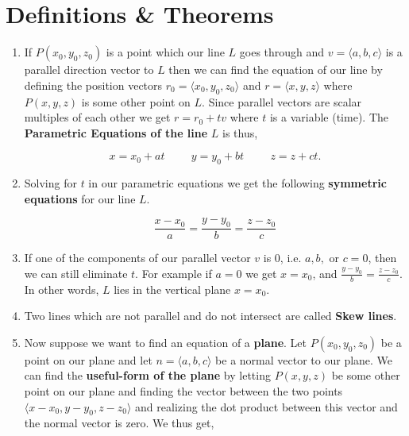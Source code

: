 \documentclass[11pt]{article}
\begin{document}
\section{Definitions \& Theorems}
\begin{enumerate}
    \item If $P(x_0,y_0,z_0)$ is a point which our line $L$ goes through and $v=\langle a,b,c \rangle$ is a parallel direction vector to $L$ then we can find the equation of our line by defining the position vectors $r_0 = \langle x_0,y_0,z_0 \rangle$ and $r = \langle x,y,z \rangle$ where $P(x,y,z)$ is some other point on $L$. Since parallel vectors are scalar multiples of each other we get $r=r_0+tv$ where $t$ is a variable (time). The \textbf{Parametric Equations of the line} $L$ is thus,

    \begin{equation*}
        x=x_0+at \hspace{1cm} y=y_0+bt \hspace{1cm} z = z+ct.
    \end{equation*}


\item  Solving for $t$ in our parametric equations we get the following \textbf{symmetric equations} for our line $L$.

\begin{equation*}
    \frac{x-x_0}{a} = \frac{y-y_0}{b} = \frac{z-z_0}{c}
\end{equation*}

\item  If one of the components of our parallel vector $v$ is 0, i.e. $a,b, \text{ or } c = 0$, then we can still eliminate $t$. For example if $a=0$ we get $x=x_0$, and $\frac{y-y_0}{b}=\frac{z-z_0}{c}$. In other words, $L$ lies in the vertical plane $x=x_0$.

\item Two lines which are not parallel and do not intersect are called \textbf{Skew lines}.

\item Now suppose we want to find an equation of a \textbf{plane}. Let $P(x_0,y_0,z_0)$ be a point on our plane and let $n = \langle a,b,c \rangle$ be a normal vector to our plane. We can find the \textbf{useful-form of the plane} by letting $P(x,y,z)$ be some other point on our plane and finding the vector between the two points $\langle x-x_0,y-y_0,z-z_0 \rangle$ and realizing the dot product between this vector and the normal vector is zero. We thus get,


\end{enumerate}
\end{document}
